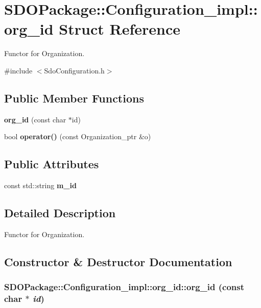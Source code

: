 \section{SDOPackage::Configuration\_\-impl::org\_\-id Struct Reference}
\label{structSDOPackage_1_1Configuration__impl_1_1org__id}


Functor for Organization.  




{\ttfamily \#include $<$SdoConfiguration.h$>$}

\subsection*{Public Member Functions}
\begin{DoxyCompactItemize}
\item 
{\bf org\_\-id} (const char $\ast$id)
\item 
bool {\bf operator()} (const Organization\_\-ptr \&o)
\end{DoxyCompactItemize}
\subsection*{Public Attributes}
\begin{DoxyCompactItemize}
\item 
const std::string {\bf m\_\-id}
\end{DoxyCompactItemize}


\subsection{Detailed Description}
Functor for Organization. 

\subsection{Constructor \& Destructor Documentation}
\subsubsection[{org\_\-id}]{\setlength{\rightskip}{0pt plus 5cm}SDOPackage::Configuration\_\-impl::org\_\-id::org\_\-id (const char $\ast$ {\em id})\hspace{0.3cm}{\ttfamily  [inline]}}\label{structSDOPackage_1_1Configuration__impl_1_1org__id_a1aff6392a1613e8a5a858c744be87559}


